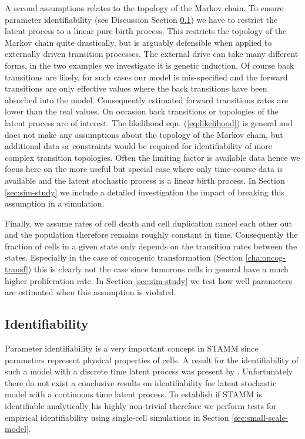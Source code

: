 \begin{figure}
{ }
  \label{fig:schematic-ass1}
\end{figure}

A second assumptions relates to the topology of the Markov chain. To ensure parameter identifiability (see Discussion Section \ref{sec:identifiability}) we have to restrict the latent process to a linear pure birth process. This restricts the topology of the Markov chain quite drastically, but is arguably defensible when applied to externally driven transition processes. The external drive can take many different forms, in the two examples we investigate it is genetic induction. Of course back transitions are likely, for such cases our model is mis-specified and the forward transitions are only effective values where the back transitions have been absorbed into the model. Consequently estimated forward transitions rates are lower than the real values. On occasion back transitions or topologies of the latent process are of interest.
The likelihood eqn. (\ref{eq:likelihood}) is general and does not make any assumptions about the topology of the Markov chain, but additional data or constraints would be required for identifiability of more complex transition topologies. Often the limiting factor is available data hence we focus here on the more useful but special case where only time-course data is available and the latent stochastic process is a linear birth process. In Section \ref{sec:sim-study} we include a detailed investigation the impact of breaking this assumption in a simulation. 

Finally, we assume rates of cell death and cell duplication cancel each other out and the population therefore remains roughly constant in time. Consequently the fraction of cells in a given state only depends on the transition rates between the states. Especially in the case of oncogenic transformation (Section \ref{cha:oncog-transf}) this is clearly not the case since tumorous cells in general have a much higher proliferation rate. In Section \ref{sec:sim-study} we test how well parameters are estimated when this assumption is violated.

\subsection{Identifiability}
\label{sec:identifiability}

Parameter identifiability is a very important concept in STAMM since parameters represent physical properties of cells. A result for the identifiability of such a model with a discrete time latent process was present by \cite{Clifford:1977wa}. Unfortunately there do not exist a conclusive results on identifiability for latent stochastic model with a continuous time latent process. To establish if STAMM is identifiable analytically his highly non-trivial therefore we perform tests for empirical identifiability using single-cell simulations in Section \ref{sec:small-scale-model}. 

